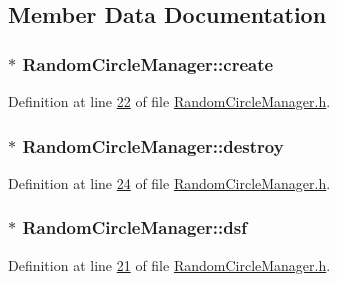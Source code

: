 \subsection{Member Data Documentation}
\hypertarget{class_random_circle_manager_a5df9bb06afdb248a8400f4f708c16f0b}{}
\subsubsection[{create}]{$\ast$ Random\+Circle\+Manager\+::create}\label{class_random_circle_manager_a5df9bb06afdb248a8400f4f708c16f0b}


Definition at line \hyperlink{_random_circle_manager_8h_source_l00022}{22} of file \hyperlink{_random_circle_manager_8h_source}{Random\+Circle\+Manager.\+h}.

\hypertarget{class_random_circle_manager_af87d7d788cd9c4a1a37a30ad959cc445}{}
\subsubsection[{destroy}]{$\ast$ Random\+Circle\+Manager\+::destroy}\label{class_random_circle_manager_af87d7d788cd9c4a1a37a30ad959cc445}


Definition at line \hyperlink{_random_circle_manager_8h_source_l00024}{24} of file \hyperlink{_random_circle_manager_8h_source}{Random\+Circle\+Manager.\+h}.

\hypertarget{class_random_circle_manager_acd654c100c962b48a97aff05fdf3aa5d}{}
\subsubsection[{dsf}]{$\ast$ Random\+Circle\+Manager\+::dsf}\label{class_random_circle_manager_acd654c100c962b48a97aff05fdf3aa5d}


Definition at line \hyperlink{_random_circle_manager_8h_source_l00021}{21} of file \hyperlink{_random_circle_manager_8h_source}{Random\+Circle\+Manager.\+h}.

